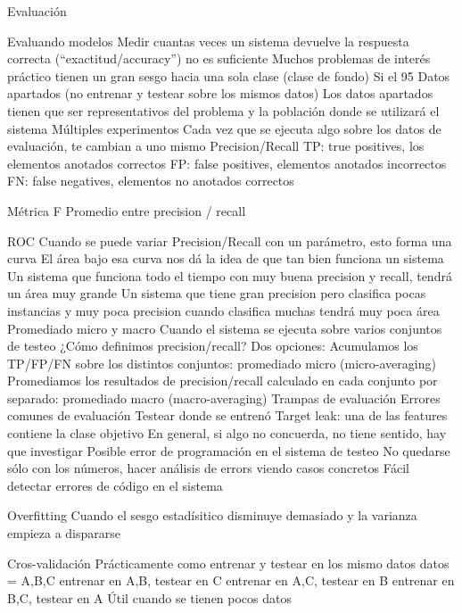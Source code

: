 Evaluación

Evaluando modelos
Medir cuantas veces un sistema devuelve la respuesta correcta (“exactitud/accuracy”) no es suficiente
Muchos problemas de interés práctico tienen un gran sesgo hacia una sola clase (clase de fondo)
Si el 95%
Datos apartados (no entrenar y testear sobre los mismos datos)
Los datos apartados tienen que ser representativos del problema y la población donde se utilizará el sistema
Múltiples experimentos
Cada vez que se ejecuta algo sobre los datos de evaluación, te cambian a uno mismo
Precision/Recall
TP: true positives, los elementos anotados correctos
FP: false positives, elementos anotados incorrectos
FN: false negatives, elementos no anotados correctos

Métrica F Promedio entre precision / recall

ROC
Cuando se puede variar Precision/Recall con un parámetro, esto forma una curva
El área bajo esa curva nos dá la idea de que tan bien funciona un sistema
Un sistema que funciona todo el tiempo con muy buena precision y recall, tendrá un área muy grande
Un sistema que tiene gran precision pero clasifica pocas instancias y muy poca precision cuando clasifica muchas tendrá muy poca área
Promediado micro y macro
Cuando el sistema se ejecuta sobre varios conjuntos de testeo
¿Cómo definimos precision/recall?
Dos opciones:
Acumulamos los TP/FP/FN sobre los distintos conjuntos: promediado micro (micro-averaging)
Promediamos los resultados de precision/recall calculado en cada conjunto por separado: promediado macro (macro-averaging)
Trampas de evaluación
Errores comunes de evaluación
Testear donde se entrenó
Target leak: una de las features contiene la clase objetivo
En general, si algo no concuerda, no tiene sentido, hay que investigar
Posible error de programación en el sistema de testeo
No quedarse sólo con los números, hacer análisis de errors viendo casos concretos
Fácil detectar errores de código en el sistema

Overfitting
Cuando el sesgo estadísitico disminuye demasiado y la varianza empieza a dispararse

Cros-validación
Prácticamente como entrenar y testear en los mismo datos
datos = {A,B,C}
entrenar en A,B, testear en C
entrenar en A,C, testear en B
entrenar en B,C, testear en A
Útil cuando se tienen pocos datos


